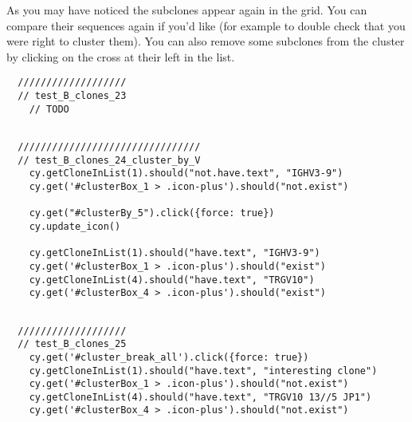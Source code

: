 As you may have noticed the subclones appear again in the grid. You can
compare their sequences again if you'd like (for example to double check that
you were right to cluster them). You can also remove some subclones from the
cluster by clicking on the cross at their left in the list.
\begin{verbatim}
  ///////////////////
  // test_B_clones_23
    // TODO


\end{verbatim}

\begin{verbatim}
  ////////////////////////////////
  // test_B_clones_24_cluster_by_V
    cy.getCloneInList(1).should("not.have.text", "IGHV3-9")
    cy.get('#clusterBox_1 > .icon-plus').should("not.exist")

    cy.get("#clusterBy_5").click({force: true})
    cy.update_icon()

    cy.getCloneInList(1).should("have.text", "IGHV3-9")
    cy.get('#clusterBox_1 > .icon-plus').should("exist")
    cy.getCloneInList(4).should("have.text", "TRGV10")
    cy.get('#clusterBox_4 > .icon-plus').should("exist")


\end{verbatim}

\begin{verbatim}
  ///////////////////
  // test_B_clones_25
    cy.get('#cluster_break_all').click({force: true})
    cy.getCloneInList(1).should("have.text", "interesting clone")
    cy.get('#clusterBox_1 > .icon-plus').should("not.exist")
    cy.getCloneInList(4).should("have.text", "TRGV10 13//5 JP1")
    cy.get('#clusterBox_4 > .icon-plus').should("not.exist")


\end{verbatim}


